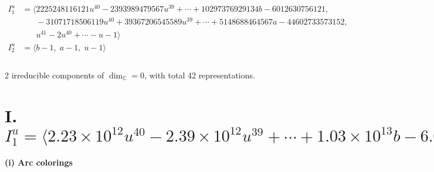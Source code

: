 \documentclass[1p]{elsarticle_modified}
\theoremstyle{definition}
\begin{document}
\begin{align*}
I^u_{1}&=\langle 
2225248116121 u^{40}-2393989479567 u^{39}+\cdots+10297376929134 b-6012630756121,\\
\phantom{I^u_{1}}&\phantom{= \langle  }-31071718506119 u^{40}+39367206545589 u^{39}+\cdots+5148688464567 a-44602733573152,\\
\phantom{I^u_{1}}&\phantom{= \langle  }u^{41}-2 u^{40}+\cdots- u-1\rangle \\
I^u_{2}&=\langle 
b-1,\;a-1,\;u-1\rangle \\
\\
\end{align*}
\raggedright * 2 irreducible components of $\dim_{\mathbb{C}}=0$, with total 42 representations.\\
\newpage
\renewcommand{\arraystretch}{1}
\centering \section*{I. $I^u_{1}= \langle 2.23\times10^{12} u^{40}-2.39\times10^{12} u^{39}+\cdots+1.03\times10^{13} b-6.01\times10^{12},\;-3.11\times10^{13} u^{40}+3.94\times10^{13} u^{39}+\cdots+5.15\times10^{12} a-4.46\times10^{13},\;u^{41}-2 u^{40}+\cdots- u-1 \rangle$}
\flushleft \textbf{(i) Arc colorings}\\
\end{document}
